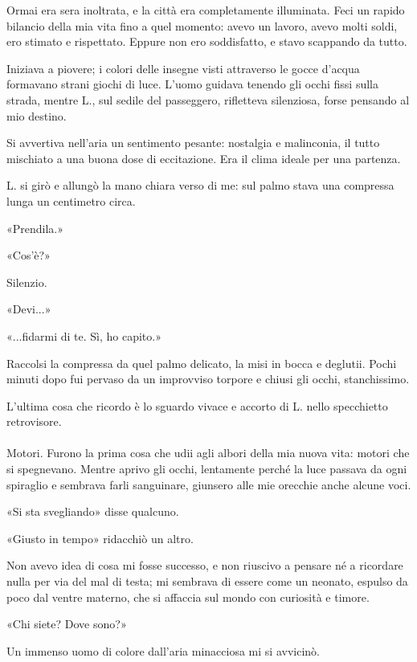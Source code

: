 \documentclass[a4paper,12pt]{book}
\begin{document}
Ormai era sera inoltrata, e la città era completamente illuminata. Feci un
rapido bilancio della mia vita fino a quel momento: avevo un lavoro, avevo molti
soldi, ero stimato e rispettato. Eppure non ero soddisfatto, e stavo scappando
da tutto.

Iniziava a piovere; i colori delle insegne visti attraverso le gocce d’acqua
formavano strani giochi di luce. L’uomo guidava tenendo gli occhi fissi sulla
strada, mentre L., sul sedile del passeggero, rifletteva silenziosa, forse
pensando al mio destino.

Si avvertiva nell’aria un sentimento pesante: nostalgia e malinconia, il tutto
mischiato a una buona dose di eccitazione. Era il clima ideale per una partenza.

L. si girò e allungò la mano chiara verso di me: sul palmo stava una compressa
lunga un centimetro circa.

«Prendila.»

«Cos’è?»

Silenzio.

«Devi...»

«...fidarmi di te. Sì, ho capito.»

Raccolsi la compressa da quel palmo delicato, la misi in bocca e deglutii. Pochi
minuti dopo fui pervaso da un improvviso torpore e chiusi gli occhi,
stanchissimo.

L’ultima cosa che ricordo è lo sguardo vivace e accorto di L. nello
specchietto retrovisore.

\paragraph{}
Motori. Furono la prima cosa che udii agli albori della mia nuova vita: motori
che si spegnevano. Mentre aprivo gli occhi, lentamente perché la luce passava
da ogni spiraglio e sembrava farli sanguinare, giunsero alle mie orecchie anche
alcune voci.

«Si sta svegliando» disse qualcuno.

«Giusto in tempo» ridacchiò un altro.

Non avevo idea di cosa mi fosse successo, e non riuscivo a pensare né a
ricordare nulla per via del mal di testa; mi sembrava di essere come un neonato,
espulso da poco dal ventre materno, che si affaccia sul mondo con curiosità e
timore.

«Chi siete? Dove sono?»

Un immenso uomo di colore dall’aria minacciosa mi si avvicinò.
\end{document}
